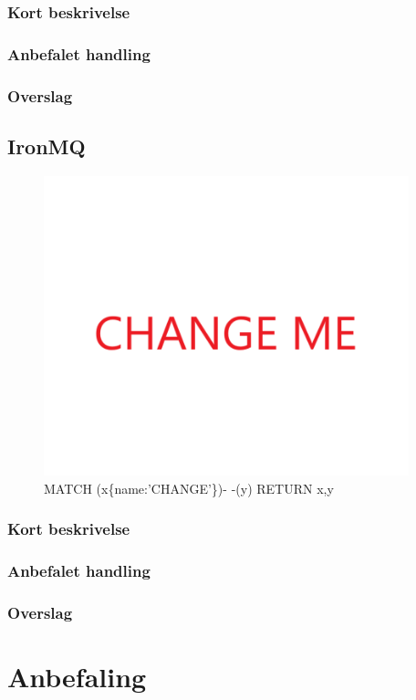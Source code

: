\documentclass{article}
\begin{document}
\subsubsection{Kort beskrivelse}
\subsubsection{Anbefalet handling}
\subsubsection{Overslag}
\subsection{IronMQ}
\begin{figure}[h]
\includegraphics[width=300pt]{CHANGE.PNG}
\caption{MATCH (x\{name:'CHANGE'\})- -(y) RETURN x,y}
\end{figure}
\subsubsection{Kort beskrivelse}
\subsubsection{Anbefalet handling}
\subsubsection{Overslag}



\section{Anbefaling}

\end{document}
